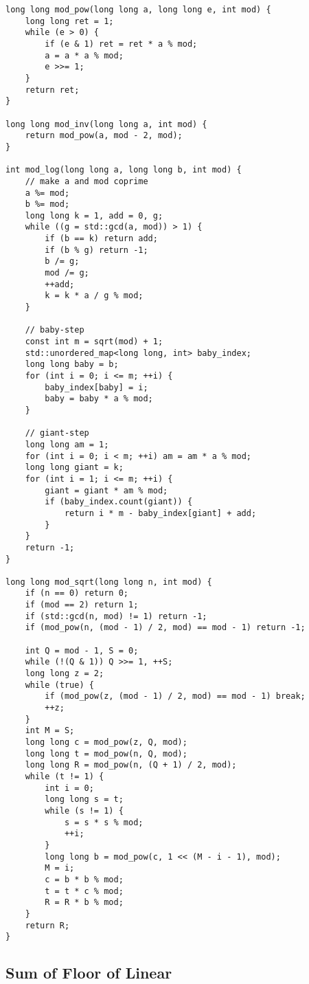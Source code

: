 \begin{lstlisting}
long long mod_pow(long long a, long long e, int mod) {
    long long ret = 1;
    while (e > 0) {
        if (e & 1) ret = ret * a % mod;
        a = a * a % mod;
        e >>= 1;
    }
    return ret;
}

long long mod_inv(long long a, int mod) {
    return mod_pow(a, mod - 2, mod);
}

int mod_log(long long a, long long b, int mod) {
    // make a and mod coprime
    a %= mod;
    b %= mod;
    long long k = 1, add = 0, g;
    while ((g = std::gcd(a, mod)) > 1) {
        if (b == k) return add;
        if (b % g) return -1;
        b /= g;
        mod /= g;
        ++add;
        k = k * a / g % mod;
    }

    // baby-step
    const int m = sqrt(mod) + 1;
    std::unordered_map<long long, int> baby_index;
    long long baby = b;
    for (int i = 0; i <= m; ++i) {
        baby_index[baby] = i;
        baby = baby * a % mod;
    }

    // giant-step
    long long am = 1;
    for (int i = 0; i < m; ++i) am = am * a % mod;
    long long giant = k;
    for (int i = 1; i <= m; ++i) {
        giant = giant * am % mod;
        if (baby_index.count(giant)) {
            return i * m - baby_index[giant] + add;
        }
    }
    return -1;
}

long long mod_sqrt(long long n, int mod) {
    if (n == 0) return 0;
    if (mod == 2) return 1;
    if (std::gcd(n, mod) != 1) return -1;
    if (mod_pow(n, (mod - 1) / 2, mod) == mod - 1) return -1;

    int Q = mod - 1, S = 0;
    while (!(Q & 1)) Q >>= 1, ++S;
    long long z = 2;
    while (true) {
        if (mod_pow(z, (mod - 1) / 2, mod) == mod - 1) break;
        ++z;
    }
    int M = S;
    long long c = mod_pow(z, Q, mod);
    long long t = mod_pow(n, Q, mod);
    long long R = mod_pow(n, (Q + 1) / 2, mod);
    while (t != 1) {
        int i = 0;
        long long s = t;
        while (s != 1) {
            s = s * s % mod;
            ++i;
        }
        long long b = mod_pow(c, 1 << (M - i - 1), mod);
        M = i;
        c = b * b % mod;
        t = t * c % mod;
        R = R * b % mod;
    }
    return R;
}

\end{lstlisting}

\subsection{Sum of Floor of Linear}

